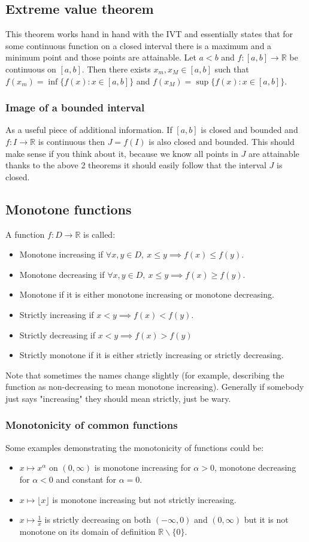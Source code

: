 \documentclass[12pt]{article}
\begin{document}
\subsection*{Extreme value theorem}
This theorem works hand in hand with the IVT and essentially states that for some continuous function on a closed interval there is a maximum and a minimum point and those points are attainable. Let \(a<b\) and \(f:[a,b]\to\mathbb{R}\) be continuous on \([a,b]\). Then there exists \(x_m,x_M\in[a,b]\) such that \(f(x_m)=\inf\{f(x):x\in[a,b]\}\) and \(f(x_M)=\sup\{f(x):x\in[a,b]\}\).
\subsubsection*{Image of a bounded interval}
As a useful piece of additional information. If \([a,b]\) is closed and bounded and \(f:I\to\mathbb{R}\) is continuous then \(J=f(I)\) is also closed and bounded. This should make sense if you think about it, because we know all points in \(J\) are attainable thanks to the above 2 theorems it should easily follow that the interval \(J\) is closed.
\subsection*{Monotone functions}
A function \(f:D\to\mathbb{R}\) is called:
\begin{itemize}
    \item Monotone increasing if \(\forall x,y\in D,\  x\leq y\implies f(x)\leq f(y)\).
    \item Monotone decreasing if \(\forall x,y\in D,\  x\leq y\implies f(x)\geq f(y)\).
    \item Monotone if it is either monotone increasing or monotone decreasing.
    \item Strictly increasing if \(x<y\implies f(x)<f(y)\).
    \item Strictly decreasing if \(x<y\implies f(x)>f(y)\)
    \item Strictly monotone if it is either strictly increasing or strictly decreasing.
\end{itemize}
Note that sometimes the names change slightly (for example, describing the function as non-decreasing to mean monotone increasing). Generally if somebody just says "increasing" they should mean strictly, just be wary.
\subsubsection*{Monotonicity of common functions}
Some examples demonstrating the monotonicity of functions could be:
\begin{itemize}
    \item \(x\mapsto x^\alpha\) on \((0,\infty)\) is monotone increasing for \(\alpha>0\), monotone decreasing for \(\alpha<0\) and constant for \(\alpha=0\).
    \item \(x\mapsto\lfloor x\rfloor\) is monotone increasing but not strictly increasing.
    \item \(x\mapsto\frac{1}{x}\) is strictly decreasing on both \((-\infty,0)\) and \((0,\infty)\) but it is not monotone on its domain of definition \(\mathbb{R}\backslash\{0\}\).
\end{itemize}
\end{document}
